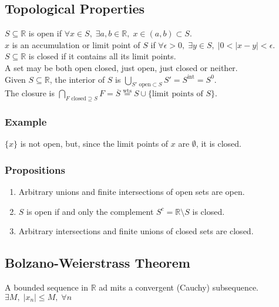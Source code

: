 \documentclass[11pt]{article}
\newcommand{\0}{\emptyset}
\newcommand{\R}{\mathbb{R}}
\begin{document}
\subsection*{Topological Properties}
\label{sec:org6c6e80d}
\(S\subseteq\R\) is open if \(\forall x\in S,\;\exists a,b\in\R,\;x\in(a,b)\subset S\).\\[0pt]
\(x\) is an accumulation or limit point of \(S\) if \(\forall\epsilon>0,\;\exists y\in S,\;|0<|x-y|<\epsilon\).\\[0pt]
\(S\subseteq\R\) is closed if it contains all its limit points.\\[0pt]
A set may be both open closed, just open, just closed or neither.\\[0pt]
Given \(S\subseteq\R\), the interior of \(S\) is \(\bigcup_{S'\text{ open}\subset S}S'=S^{\text{int}}=S^{0}\).\\[0pt]
The closure is \(\bigcap_{F\text{ closed}\supseteq S}F=\overline{S}\overset{\text{wts}}{=}S\cup\{\text{limit points of }S\}\).\\[0pt]
\subsubsection*{Example}
\label{sec:org56b88c8}
\(\{x\}\) is not open, but, since the limit points of \(x\) are \(\0\), it is closed.\\[0pt]
\subsubsection*{Propositions}
\label{sec:org07d2ecb}
\begin{enumerate}
\item Arbitrary unions and finite intersections of open sets are open.\\[0pt]
\item \(S\) is open if and only the complement \(S^{c}=\R\setminus S\) is closed.\\[0pt]
\item Arbitrary intersections and finite unions of closed sets are closed.\\[0pt]
\end{enumerate}
\subsection*{Bolzano-Weierstrass Theorem}
\label{sec:org57cf4d5}
A bounded sequence in \(\R\) ad mits a convergent (Cauchy) subsequence. \(\exists M,\;|x_{n}|\leq M,\;\forall n\)\\[0pt]
\end{document}
